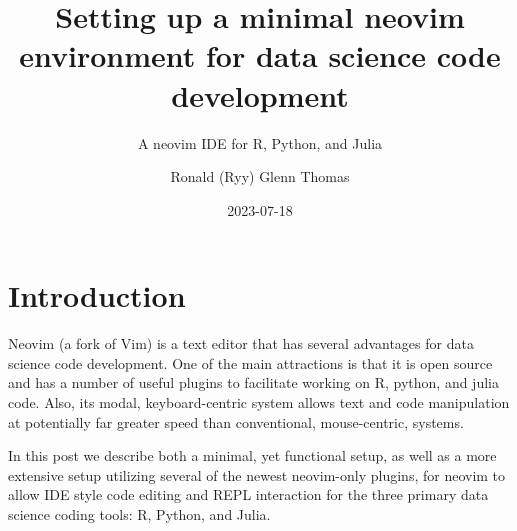 \documentclass[
  letterpaper,
  DIV=11,
  numbers=noendperiod,
  oneside]{scrartcl}
\title{Setting up a minimal neovim environment for data science code
development}
\subtitle{A neovim IDE for R, Python, and Julia}
\author{Ronald (Ryy) Glenn Thomas}
\date{2023-07-18}
\renewcommand*\contentsname{Table of contents}
\newcommand\contentsname{Table of contents}
\begin{document}
\maketitle
\renewcommand*\contentsname{Table of contents}
{
\hypersetup{linkcolor=}
\setcounter{tocdepth}{3}
\tableofcontents
}

\section{Introduction}\label{introduction}

Neovim (a fork of Vim) is a text editor that has several advantages for
data science code development. One of the main attractions is that it is
open source and has a number of useful plugins to facilitate working on
R, python, and julia code. Also, its modal, keyboard-centric system
allows text and code manipulation at potentially far greater speed than
conventional, mouse-centric, systems.

In this post we describe both a minimal, yet functional setup, as well
as a more extensive setup utilizing several of the newest neovim-only
plugins, for neovim to allow IDE style code editing and REPL interaction
for the three primary data science coding tools: R, Python, and Julia.
\end{document}
